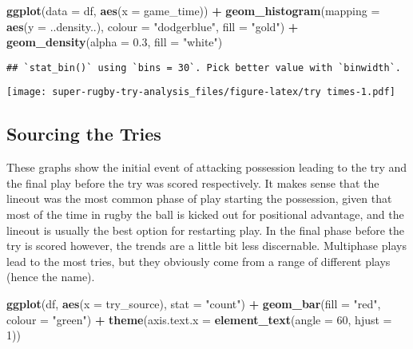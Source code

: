 \documentclass[
]{article}
\newenvironment{Shaded}{\begin{snugshade}}{\end{snugshade}}
\newcommand{\DataTypeTok}[1]{\textcolor[rgb]{0.13,0.29,0.53}{#1}}
\newcommand{\DecValTok}[1]{\textcolor[rgb]{0.00,0.00,0.81}{#1}}
\newcommand{\FloatTok}[1]{\textcolor[rgb]{0.00,0.00,0.81}{#1}}
\newcommand{\KeywordTok}[1]{\textcolor[rgb]{0.13,0.29,0.53}{\textbf{#1}}}
\newcommand{\NormalTok}[1]{#1}
\newcommand{\OperatorTok}[1]{\textcolor[rgb]{0.81,0.36,0.00}{\textbf{#1}}}
\newcommand{\StringTok}[1]{\textcolor[rgb]{0.31,0.60,0.02}{#1}}
\begin{document}
\begin{Shaded}
\begin{Highlighting}[]
\KeywordTok{ggplot}\NormalTok{(}\DataTypeTok{data =}\NormalTok{ df, }\KeywordTok{aes}\NormalTok{(}\DataTypeTok{x =}\NormalTok{ game_time)) }\OperatorTok{+}
\StringTok{  }\KeywordTok{geom_histogram}\NormalTok{(}\DataTypeTok{mapping =} \KeywordTok{aes}\NormalTok{(}\DataTypeTok{y =}\NormalTok{ ..density..), }\DataTypeTok{colour =} \StringTok{"dodgerblue"}\NormalTok{, }\DataTypeTok{fill =} \StringTok{"gold"}\NormalTok{) }\OperatorTok{+}
\StringTok{  }\KeywordTok{geom_density}\NormalTok{(}\DataTypeTok{alpha =} \FloatTok{0.3}\NormalTok{, }\DataTypeTok{fill =} \StringTok{"white"}\NormalTok{)}
\end{Highlighting}
\end{Shaded}

\begin{verbatim}
## `stat_bin()` using `bins = 30`. Pick better value with `binwidth`.
\end{verbatim}

\texttt{[image: super-rugby-try-analysis\_files/figure-latex/try times-1.pdf]}

\hypertarget{sourcing-the-tries}{%
\subsection{\texorpdfstring{\textbf{Sourcing the
Tries}}{Sourcing the Tries}}\label{sourcing-the-tries}}

These graphs show the initial event of attacking possession leading to
the try and the final play before the try was scored respectively. It
makes sense that the lineout was the most common phase of play starting
the possession, given that most of the time in rugby the ball is kicked
out for positional advantage, and the lineout is usually the best option
for restarting play. In the final phase before the try is scored
however, the trends are a little bit less discernable. Multiphase plays
lead to the most tries, but they obviously come from a range of
different plays (hence the name).

\begin{Shaded}
\begin{Highlighting}[]
\KeywordTok{ggplot}\NormalTok{(df, }\KeywordTok{aes}\NormalTok{(}\DataTypeTok{x =}\NormalTok{ try_source), }\DataTypeTok{stat =} \StringTok{"count"}\NormalTok{) }\OperatorTok{+}
\StringTok{  }\KeywordTok{geom_bar}\NormalTok{(}\DataTypeTok{fill =} \StringTok{"red"}\NormalTok{, }\DataTypeTok{colour =} \StringTok{"green"}\NormalTok{) }\OperatorTok{+}\StringTok{ }\KeywordTok{theme}\NormalTok{(}\DataTypeTok{axis.text.x =} \KeywordTok{element_text}\NormalTok{(}\DataTypeTok{angle =} \DecValTok{60}\NormalTok{, }\DataTypeTok{hjust =} \DecValTok{1}\NormalTok{))}
\end{Highlighting}
\end{Shaded}
\end{document}
